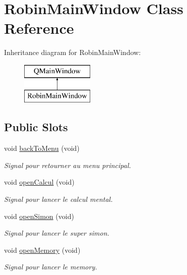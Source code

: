 \hypertarget{class_robin_main_window}{}\section{Robin\+Main\+Window Class Reference}
\label{class_robin_main_window}
Inheritance diagram for Robin\+Main\+Window\+:\begin{figure}[H]
\begin{center}
\leavevmode
\includegraphics[height=2.000000cm]{class_robin_main_window}
\end{center}
\end{figure}
\subsection*{Public Slots}
\begin{DoxyCompactItemize}
\item 
void \hyperlink{class_robin_main_window_a0850e17ae24394b14eb2dcfc4f15eeca}{back\+To\+Menu} (void)
\begin{DoxyCompactList}\small\item\em Signal pour retourner au menu principal. \end{DoxyCompactList}\item 
void \hyperlink{class_robin_main_window_a55e49d0a4d727066b553fc2277dd8a78}{open\+Calcul} (void)
\begin{DoxyCompactList}\small\item\em Signal pour lancer le calcul mental. \end{DoxyCompactList}\item 
void \hyperlink{class_robin_main_window_ab00b403de3169493a08c53f5d623ce6b}{open\+Simon} (void)
\begin{DoxyCompactList}\small\item\em Signal pour lancer le super simon. \end{DoxyCompactList}\item 
void \hyperlink{class_robin_main_window_aaf62641d678eb0f8829a2fb9c513ae68}{open\+Memory} (void)
\begin{DoxyCompactList}\small\item\em Signal pour lancer le memory. \end{DoxyCompactList}\end{DoxyCompactItemize}
